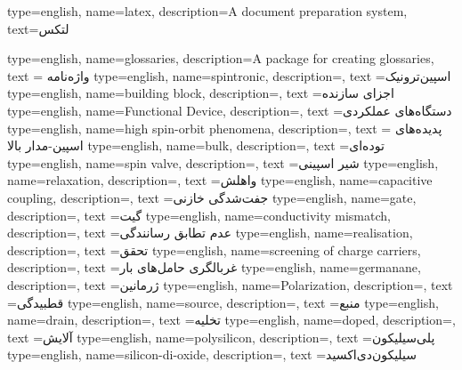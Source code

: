 {
    type=english,
    name={latex},
    description={A document preparation system},
    text={لتکس}
}

{
    type=english,
    name={glossaries},
    description={A package for creating glossaries},
    text = {واژه‌نامه}
}
{
    type=english,
    name={spintronic},
    description={},
    text ={اسپین‌ترونیک}
}
{
    type=english,
    name={building block},
    description={},
    text ={اجزای سازنده}
}
{
    type=english,
    name={Functional Device},
    description={},
    text ={دستگاه‌های عملکردی}
}
{
    type=english,
    name={high spin-orbit phenomena},
    description={},
    text ={ پدیده‌های اسپین-مدار بالا}
}
{
    type=english,
    name={bulk},
    description={},
    text ={توده‌ای}
}
{
    type=english,
    name={spin valve},
    description={},
    text ={شیر اسپینی}
}
{
    type=english,
    name={relaxation},
    description={},
    text ={واهلش}
}
{
    type=english,
    name={capacitive coupling},
    description={},
    text ={جفت‌شدگی خازنی}
}
{
    type=english,
    name={gate},
    description={},
    text ={گیت}
}
{
    type=english,
    name={conductivity mismatch},
    description={},
    text ={عدم تطابق رسانندگی}
}
{
    type=english,
    name={realisation},
    description={},
    text ={تحقق}
}
{
    type=english,
    name={screening of charge carriers},
    description={},
    text ={غربالگری حامل‌های بار}
}
{
    type=english,
    name={germanane},
    description={},
    text ={ژرمانین}
}
{
    type=english,
    name={Polarization},
    description={},
    text ={قطبیدگی}
}
{
    type=english,
    name={source},
    description={},
    text ={منبع}
}
{
    type=english,
    name={drain},
    description={},
    text ={تخلیه}
}
{
    type=english,
    name={doped},
    description={},
    text ={آلایش}
}
{
    type=english,
    name={polysilicon},
    description={},
    text ={پلی‌سیلیکون}
}
{
    type=english,
    name={silicon-di-oxide},
    description={},
    text ={سیلیکون‌دی‌اکسید}
}
